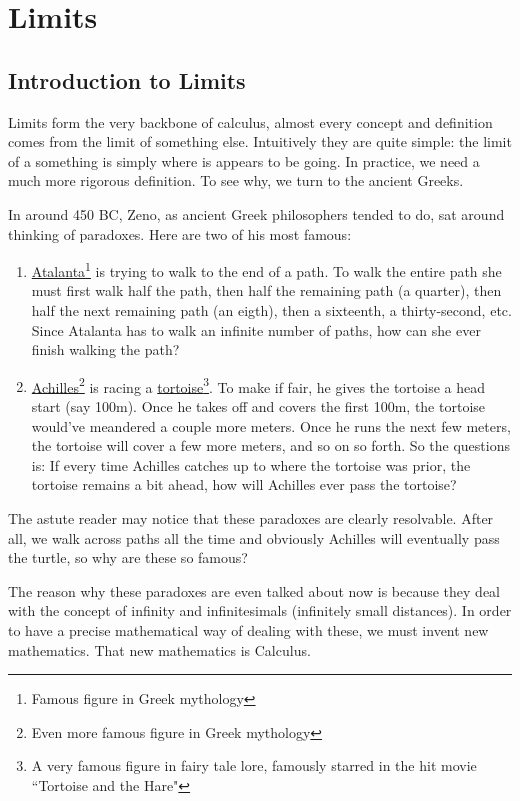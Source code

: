 \section{Limits}
\subsection{Introduction to Limits}
Limits form the very backbone of calculus, almost every concept and definition comes from the limit of something else. Intuitively they are quite simple: the limit of a something is simply where is appears to be going. In practice, we need a much more rigorous definition. To see why, we turn to the ancient Greeks.

In around 450 BC, Zeno, as ancient Greek philosophers tended to do, sat around thinking of paradoxes. Here are two of his most famous:
\begin{enumerate}
	\item \href{https://en.wikipedia.org/wiki/Atalanta}{Atalanta}\footnote{Famous figure in Greek mythology} is trying to walk to the end of a path. To walk the entire path she must first walk half the path, then half the remaining path (a quarter), then half the next remaining path (an eigth), then a sixteenth, a thirty-second, etc. Since Atalanta has to walk an infinite number of paths, how can she ever finish walking the path? 
	\item \href{https://en.wikipedia.org/wiki/Achilles}{Achilles}\footnote{Even more famous figure in Greek mythology} is racing a \href{https://en.wikipedia.org/wiki/The_Tortoise_and_the_Hare}{tortoise}\footnote{A very famous figure in fairy tale lore, famously starred in the hit movie ``Tortoise and the Hare"}. To make if fair, he gives the tortoise a head start (say 100m). Once he takes off and covers the first 100m, the tortoise would've meandered a couple more meters. Once he runs the next few meters, the tortoise will cover a few more meters, and so on so forth. So the questions is: If every time Achilles catches up to where the tortoise was prior, the tortoise remains a bit ahead, how will Achilles ever pass the tortoise?
\end{enumerate}

The astute reader may notice that these paradoxes are clearly resolvable. After all, we walk across paths all the time and obviously Achilles will eventually pass the turtle, so why are these so famous? 

The reason why these paradoxes are even talked about now is because they deal with the concept of infinity and infinitesimals (infinitely small distances). In order to have a precise mathematical way of dealing with these, we must invent new mathematics. That new mathematics is Calculus.

